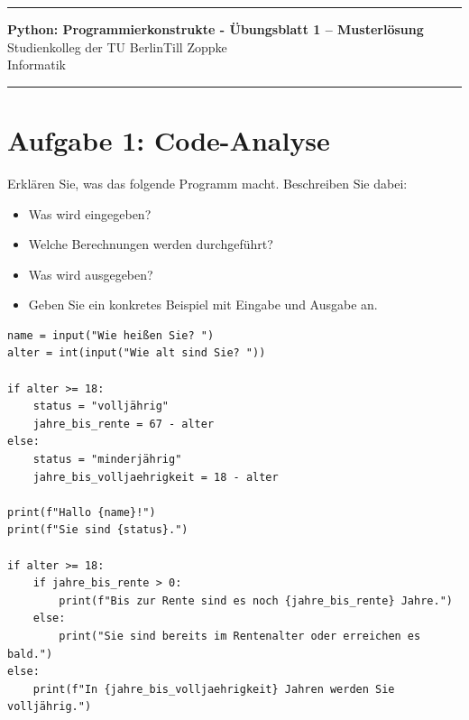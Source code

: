 \documentclass[ngerman,11pt]{article}
\date{\DTMgermanmonthname{\month} \the\year}
\begin{document}
\hrule
\begin{center}
{\large\bf Python: Programmierkonstrukte - Übungsblatt 1 -- Musterlösung}\\[-0mm]
Studienkolleg der TU Berlin\hfill Till Zoppke\\
Informatik \hfill \DTMgermanmonthname{\month} \the\year\\[2mm]
\end{center}
\hrule
\par\bigskip

\section*{Aufgabe 1: Code-Analyse}

Erklären Sie, was das folgende Programm macht. Beschreiben Sie dabei:
\begin{itemize}[leftmargin=*]
\item Was wird eingegeben?
\item Welche Berechnungen werden durchgeführt?
\item Was wird ausgegeben?
\item Geben Sie ein konkretes Beispiel mit Eingabe und Ausgabe an.
\end{itemize}

\begin{lstlisting}
name = input("Wie heißen Sie? ")
alter = int(input("Wie alt sind Sie? "))

if alter >= 18:
    status = "volljährig"
    jahre_bis_rente = 67 - alter
else:
    status = "minderjährig"
    jahre_bis_volljaehrigkeit = 18 - alter

print(f"Hallo {name}!")
print(f"Sie sind {status}.")

if alter >= 18:
    if jahre_bis_rente > 0:
        print(f"Bis zur Rente sind es noch {jahre_bis_rente} Jahre.")
    else:
        print("Sie sind bereits im Rentenalter oder erreichen es bald.")
else:
    print(f"In {jahre_bis_volljaehrigkeit} Jahren werden Sie volljährig.")
\end{lstlisting}
\end{document}
